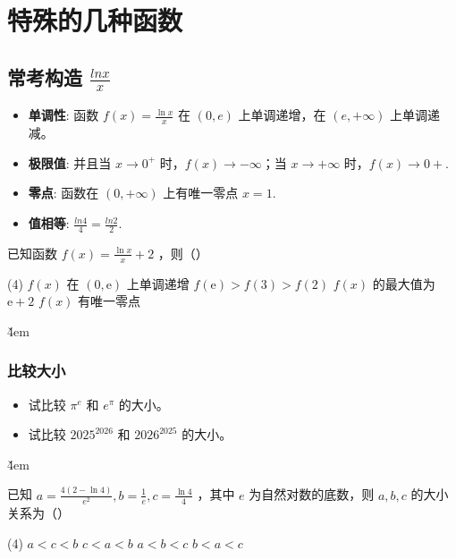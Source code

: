 \section{特殊的几种函数}

\subsection{常考构造 $\frac{lnx}{x}$}

\begin{theorem}
    \begin{itemize}
        \item \textbf{单调性}: 函数 $f(x) = \frac{\ln x}{x}$ 在 $(0, e)$ 上单调递增，在 $(e, +\infty)$ 上单调递减。
        \item \textbf{极限值}: 并且当 $x \to 0^+$ 时，$f(x) \to -\infty$；当 $x \to +\infty$ 时，$f(x) \to 0+$.
        \item \textbf{零点}: 函数在 $(0, +\infty)$ 上有唯一零点 $x = 1$.
        \item \textbf{值相等}: $\frac{ln4}{4} = \frac{ln2}{2}$.
    \end{itemize}
\end{theorem}

\begin{example}
    已知函数 $f(x)=\frac{\ln x}{x}+2$ ，则（\quad）
    \begin{tasks}(4)
        \task $f(x)$ 在 $(0, \mathrm{e})$ 上单调递增
        \task $f(\mathrm{e})>f(3)>f(2)$
        \task $f(x)$ 的最大值为 $\mathrm{e}+2$
        \task $f(x)$ 有唯一零点
    \end{tasks}
\end{example}

\v{4em}

\subsubsection{比较大小}

\begin{problem}
\begin{itemize}
    \item 试比较 $\pi^e$ 和 $e^\pi$ 的大小。
    \item 试比较 $2025^{2026}$ 和 $2026^{2025}$ 的大小。
\end{itemize}
\end{problem}

\v{4em}

\begin{example}
    已知 $a=\frac{4(2-\ln 4)}{e^2}, b=\frac{1}{e}, c=\frac{\ln 4}{4}$ ，其中 $e$ 为自然对数的底数，则 $a, b, c$ 的大小关系为（\quad）
    \begin{tasks}(4)
        \task $a<c<b$
        \task $c<a<b$
        \task $a<b<c$
        \task $b<a<c$
    \end{tasks}
\end{example}

